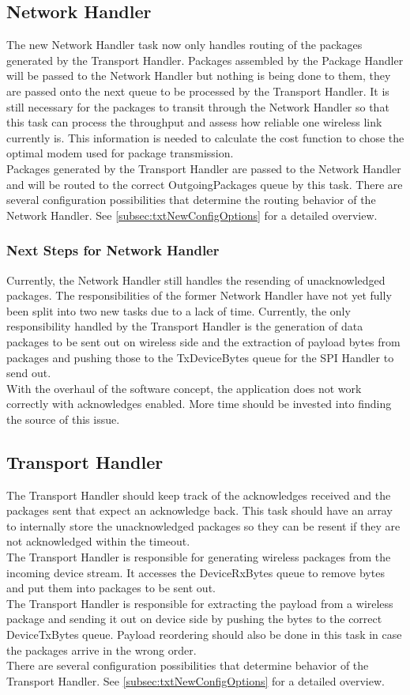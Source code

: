 \subsection{Network Handler}
The new Network Handler task now only handles routing of the packages generated by the Transport Handler. Packages assembled by the Package Handler will be passed to the Network Handler but nothing is being done to them, they are passed onto the next queue to be processed by the Transport Handler. It is still necessary for the packages to transit through the Network Handler so that this task can process the throughput and assess how reliable one wireless link currently is. This information is needed to calculate the cost function to chose the optimal modem used for package transmission.\\
Packages generated by the Transport Handler are passed to the Network Handler and will be routed to the correct OutgoingPackages queue by this task. There are several configuration possibilities that determine the routing behavior of the Network Handler. See \autoref{subsec:txtNewConfigOptions} for a detailed overview.
\subsubsection{Next Steps for Network Handler}
Currently, the Network Handler still handles the resending of unacknowledged packages. The responsibilities of the former Network Handler have not yet fully been split into two new tasks due to a lack of time. Currently, the only responsibility handled by the Transport Handler is the generation of data packages to be sent out on wireless side and the extraction of payload bytes from packages and pushing those to the TxDeviceBytes queue for the SPI Handler to send out.\\
With the overhaul of the software concept, the application does not work correctly with acknowledges enabled. More time should be invested into finding the source of this issue.
%
%
\subsection{Transport Handler}
The Transport Handler should keep track of the acknowledges received and the packages sent that expect an acknowledge back. This task should have an array to internally store the unacknowledged packages so they can be resent if they are not acknowledged within the timeout.\\
The Transport Handler is responsible for generating wireless packages from the incoming device stream. It accesses the DeviceRxBytes queue to remove bytes and put them into packages to be sent out.\\
The Transport Handler is responsible for extracting the payload from a wireless package and sending it out on device side by pushing the bytes to the correct DeviceTxBytes queue. Payload reordering should also be done in this task in case the packages arrive in the wrong order.\\
There are several configuration possibilities that determine behavior of the Transport Handler. See \autoref{subsec:txtNewConfigOptions} for a detailed overview.
